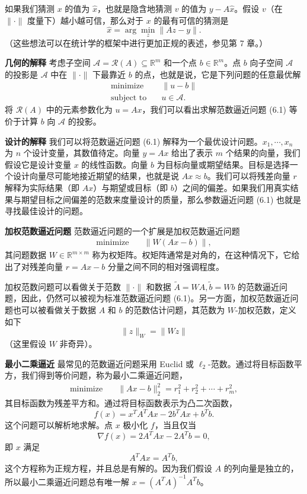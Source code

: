 \documentclass[UTF8, 12pt, fontset=fandol, oneside]{ctexart}
\begin{document}
如果我们猜测 $x$ 的值为 $\hat{x}$，也就是隐含地猜测 $v$ 的值为 $y-A\hat{x}$。假设 $v$（在 $\|\cdot\|$ 度量下）越小越可信，那么对于 $x$ 的最有可信的猜测是
\[
\hat{x}=\arg\min_z \|Az-y\|.
\]
（这些想法可以在统计学的框架中进行更加正规的表述，参见第 7 章。）

\noindent\textbf{几何的解释}\quad
考虑子空间 $\mathcal{A}=\mathcal{R}(A)\subseteq\mathbb{R}^m$ 和一个点 $b\in\mathbb{R}^m$。点 $b$ 向子空间 $\mathcal{A}$ 的投影是 $\mathcal{A}$ 中在 $\|\cdot\|$ 下最靠近 $b$ 的点，也就是说，它是下列问题的任意最优解
\[
\begin{aligned}
\text{minimize}\quad & \|u-b\|\\
\text{subject to}\quad & u\in\mathcal{A}.
\end{aligned}
\]
将 $\mathcal{R}(A)$ 中的元素参数化为 $u=Ax$，我们可以看出求解范数逼近问题 (6.1) 等价于计算 $b$ 向 $\mathcal{A}$ 的投影。

\noindent\textbf{设计的解释}\quad
我们可以将范数逼近问题 (6.1) 解释为一个最优设计问题。$x_1,\cdots,x_n$ 为 $n$ 个设计变量，其数值待定。向量 $y=Ax$ 给出了表示 $m$ 个结果的向量，我们假设它是设计变量 $x$ 的线性函数。向量 $b$ 为目标向量或期望结果。目标是选择一个设计向量尽可能地接近期望的结果，也就是说 $Ax\approx b$。我们可以将残差向量 $r$ 解释为实际结果（即 $Ax$）与期望或目标（即 $b$）之间的偏差。如果我们用真实结果与期望目标之间偏差的范数来度量设计的质量，那么参数逼近问题 (6.1) 也就是寻找最佳设计的问题。

\noindent\textbf{加权范数逼近问题}\quad
范数逼近问题的一个扩展是加权范数逼近问题
\[
\begin{aligned}
\text{minimize}\quad & \|W(Ax-b)\|,
\end{aligned}
\]
其问题数据 $W\in\mathbb{R}^{m\times m}$ 称为权矩阵。权矩阵通常是对角的，在这种情况下，它给出了对残差向量 $r=Ax-b$ 分量之间不同的相对强调程度。

加权范数问题可以看做关于范数 $\|\cdot\|$ 和数据 $\tilde{A}=WA,\tilde{b}=Wb$ 的范数逼近问题，因此，仍然可以被视为标准范数逼近问题 (6.1)。另一方面，加权范数逼近问题也可以被看做关于数据 $A$ 和 $b$ 的范数估计问题，其范数为 $W$-加权范数，定义如下
\[
\|z\|_W=\|Wz\|
\]
（这里假设 $W$ 非奇异）。

\noindent\textbf{最小二乘逼近}\quad
最常见的范数逼近问题采用 Euclid 或 $\ell_2$-范数。通过将目标函数平方，我们得到等价问题，称为最小二乘逼近问题，
\[
\begin{aligned}
\text{minimize}\quad & \|Ax-b\|_2^2=r_1^2+r_2^2+\cdots+r_m^2,
\end{aligned}
\]
其目标函数为残差平方和。通过将目标函数表示为凸二次函数，
\[
f(x)=x^TA^TAx-2b^TAx+b^Tb.
\]
这个问题可以解析地求解。点 $x$ 极小化 $f$，当且仅当
\[
\nabla f(x)=2A^TAx-2A^Tb=0,
\]
即 $x$ 满足
\[
A^TAx=A^Tb,
\]
这个方程称为正规方程，并且总是有解的。因为我们假设 $A$ 的列向量是独立的，所以最小二乘逼近问题总有唯一解 $x=(A^TA)^{-1}A^Tb$。
\end{document}
